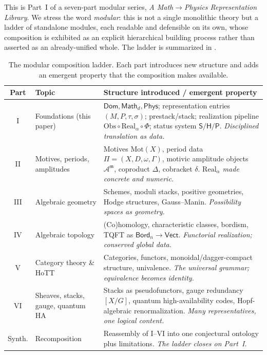 \documentclass[12pt]{article}
\theoremstyle{definition}
\theoremstyle{remark}
\newcommand{\Dom}{\mathsf{Dom}}
\newcommand{\Math}{\mathsf{Math}}
\newcommand{\Phys}{\mathsf{Phys}}
\newcommand{\Vect}{\mathsf{Vect}}
\newcommand{\Bord}{\mathsf{Bord}}
\newcommand{\Real}{\mathrm{Real}}
\newcommand{\Obs}{\mathrm{Obs}}
\newcommand{\Sstat}{\mathsf{S}}
\newcommand{\Hstat}{\mathsf{H}}
\newcommand{\Pstat}{\mathsf{P}}
\begin{document}
This is Part~I of a seven-part modular series, \emph{A Math$\to$Physics
Representation Library}. We stress the word \emph{modular}: this is not a
single monolithic theory but a ladder of standalone modules, each readable and
defensible on its own, whose composition is exhibited as an explicit
hierarchical building process rather than asserted as an already-unified whole.
The ladder is summarized in .

\begin{table}[htbp]
\centering
\small
\begin{tabular}{@{}c>{\raggedright\arraybackslash}p{3.4cm}>{\raggedright\arraybackslash}p{7.3cm}@{}}
\toprule
\textbf{Part} & \textbf{Topic} & \textbf{Structure introduced / emergent property} \\
\midrule
I & Foundations (this paper) & $\Dom,\Math_d,\Phys$; representation entries $(M,P,\tau,\sigma)$; prestack/stack; realization pipeline $\Obs\circ\Real_\alpha\circ\Phi$; status system $\Sstat/\Hstat/\Pstat$. \emph{Disciplined translation as data.} \\
II & Motives, periods, amplitudes & Motives $\mathrm{Mot}(X)$, period data $\Pi=(X,D,\omega,\Gamma)$, motivic amplitude objects $\mathcal{A}^{\mathfrak m}$, coproduct $\Delta$, cobracket $\delta$. \emph{$\Real_\alpha$ made concrete and numeric.} \\
III & Algebraic geometry & Schemes, moduli stacks, positive geometries, Hodge structures, Gauss--Manin. \emph{Possibility spaces as geometry.} \\
IV & Algebraic topology & (Co)homology, characteristic classes, bordism, TQFT as $\Bord_n \to \Vect$. \emph{Functorial realization; conserved global data.} \\
V & Category theory \& HoTT & Categories, functors, monoidal/dagger-compact structure, univalence. \emph{The universal grammar; equivalence becomes identity.} \\
VI & Sheaves, stacks, gauge, quantum HA & Stacks as pseudofunctors, gauge redundancy $[X/G]$, quantum high-availability codes, Hopf-algebraic renormalization. \emph{Many representatives, one logical content.} \\
Synth. & Recomposition & Reassembly of I--VI into one conjectural ontology plus limitations. \emph{The ladder closes on Part~I.} \\
\bottomrule
\end{tabular}
\caption{The modular composition ladder. Each part introduces new structure and
adds an emergent property that the composition makes available.}
\label{tab:ladder}
\end{table}
\end{document}
